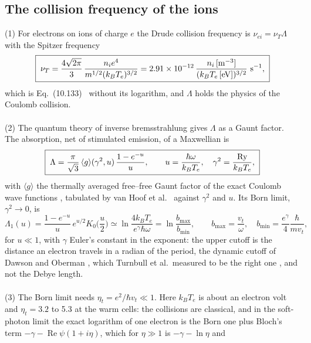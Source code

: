 \documentclass[11pt]{article}
\numberwithin{equation}{section}
\newcommand{\nuT}{\nu_T}
\newcommand{\nuei}{\nu_{ei}}
\newcommand{\vt}{v_t}
\newcommand{\kB}{k_B}
\newcommand{\Te}{T_e}
\DeclareMathOperator{\Real}{Re}
\begin{document}
\subsection{The collision frequency of the ions}
\label{sec:ions}
{\noindent}(1) For electrons on ions of charge $e$ the Drude collision frequency is
$\nuei=\nuT\Lambda$ with the Spitzer frequency
\begin{equation}
\boxed{\;\nuT=\frac{4\sqrt{2\pi}}{3}\,\frac{n_ie^4}{m^{1/2}(\kB\Te)^{3/2}}
=2.91\times10^{-12}\,\frac{n_i\,[{\rm m^{-3}}]}{(\kB\Te\,[{\rm eV}])^{3/2}}~{\rm s^{-1}},\;}
\label{eq:nuT}
\end{equation}
which is Eq.~(10.133)~\cite{Atzeni2004} without its logarithm, and $\Lambda$ holds the
physics of the Coulomb collision.
\\ \\
{\noindent}(2) The quantum theory of inverse bremsstrahlung gives $\Lambda$ as a Gaunt
factor. The absorption, net of stimulated emission, of a Maxwellian is
\begin{equation}
\boxed{\;\Lambda=\frac{\pi}{\sqrt3}\,\langle g\rangle(\gamma^2,u)\,\frac{1-e^{-u}}{u},\qquad
u=\frac{\hbar\omega}{\kB\Te},\quad\gamma^2=\frac{{\rm Ry}}{\kB\Te},\;}
\label{eq:Lambda}
\end{equation}
with $\langle g\rangle$ the thermally averaged free--free Gaunt factor of the exact
Coulomb wave functions \cite{KarzasLatter1961}, tabulated by van Hoof et al.\
\cite{vanHoof2014} against $\gamma^2$ and $u$. Its Born limit, $\gamma^2\to0$, is
\begin{equation}
\Lambda_1(u)=\frac{1-e^{-u}}{u}\,e^{u/2}K_0\Big(\frac u2\Big)
\simeq\ln\frac{4\kB\Te}{e^\gamma\hbar\omega}=\ln\frac{b_{\max}}{b_{\min}},\qquad
b_{\max}=\frac{\vt}{\omega},\quad b_{\min}=\frac{e^\gamma}{4}\frac{\hbar}{m\vt},
\label{eq:Lambda1}
\end{equation}
for $u\ll1$, with $\gamma$ Euler's constant in the exponent: the upper cutoff is the
distance an electron travels in a radian of the period, the dynamic cutoff of Dawson and
Oberman \cite{DawsonOberman1962}, which Turnbull et al.\ measured to be the right one
\cite{Turnbull2023}, and not the Debye length.
\\ \\
{\noindent}(3) The Born limit needs $\eta_t=e^2/\hbar\vt\ll1$. Here $\kB\Te$ is about an
electron volt and $\eta_t=3.2$ to 5.3 at the warm cells: the collisions are classical,
and in the soft-photon limit the exact logarithm of one electron is the Born one plus
Bloch's term $-\gamma-\Real\psi(1+i\eta)$, which for $\eta\gg1$ is $-\gamma-\ln\eta$ and
\end{document}
